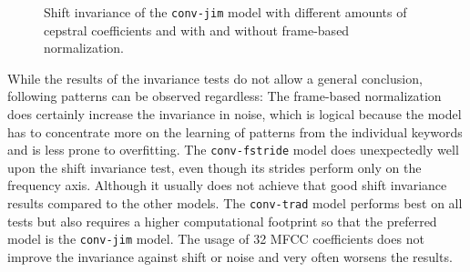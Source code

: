 \begin{figure}[!ht]
  \centering
  \quad
  \quad
  \caption{Shift invariance of the \texttt{conv-jim} model with different amounts of cepstral coefficients and with and without frame-based normalization.}
  \label{fig:exp_fs_cepstral_tb_shift_conv-jim}
\end{figure}
\FloatBarrier
\noindent
While the results of the invariance tests do not allow a general conclusion, following patterns can be observed regardless:
The frame-based normalization does certainly increase the invariance in noise, which is logical because the model has to concentrate more on the learning of patterns from the individual keywords and is less prone to overfitting.
The \texttt{conv-fstride} model does unexpectedly well upon the shift invariance test, even though its strides perform only on the frequency axis.
Although it usually does not achieve that good shift invariance results compared to the other models.
The \texttt{conv-trad} model performs best on all tests but also requires a higher computational footprint so that the preferred model is the \texttt{conv-jim} model.
The usage of 32 MFCC coefficients does not improve the invariance against shift or noise and very often worsens the results.



